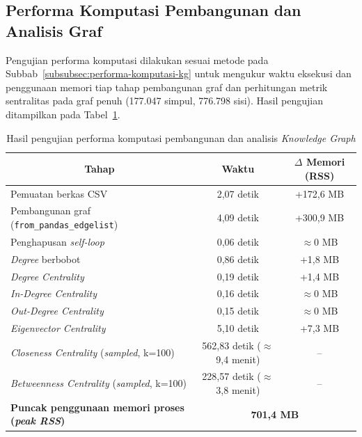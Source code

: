 \subsection{Performa Komputasi Pembangunan dan Analisis Graf}
Pengujian performa komputasi dilakukan sesuai metode pada Subbab~\ref{subsubsec:performa-komputasi-kg} untuk mengukur waktu eksekusi dan penggunaan memori tiap tahap pembangunan graf dan perhitungan metrik sentralitas pada graf penuh (177.047 simpul, 776.798 sisi). Hasil pengujian ditampilkan pada Tabel~\ref{tab:performa-komputasi-kg}.

\begin{table}[H]
\centering
\caption{Hasil pengujian performa komputasi pembangunan dan analisis \textit{Knowledge Graph}}
\label{tab:performa-komputasi-kg}
\renewcommand{\arraystretch}{1.3}
\begin{tabular}{|p{6.5cm}|c|c|}
\hline
\multicolumn{1}{|c|}{\textbf{Tahap}} & \multicolumn{1}{c|}{\textbf{Waktu}} & \multicolumn{1}{c|}{\textbf{$\Delta$ Memori (RSS)}} \\
\hline
Pemuatan berkas CSV & 2,07 detik & +172,6 MB \\
\hline
Pembangunan graf (\texttt{from\_pandas\_}\allowbreak\texttt{edgelist}) & 4,09 detik & +300,9 MB \\
\hline
Penghapusan \textit{self-loop} & 0,06 detik & $\approx$0 MB \\
\hline
\textit{Degree} berbobot & 0,86 detik & +1,8 MB \\
\hline
\textit{Degree Centrality} & 0,19 detik & +1,4 MB \\
\hline
\textit{In-Degree Centrality} & 0,16 detik & $\approx$0 MB \\
\hline
\textit{Out-Degree Centrality} & 0,15 detik & $\approx$0 MB \\
\hline
\textit{Eigenvector Centrality} & 5,10 detik & +7,3 MB \\
\hline
\textit{Closeness Centrality} (\textit{sampled}, k=100) & 562,83 detik ($\approx$9,4 menit) & -- \\
\hline
\textit{Betweenness Centrality} (\textit{sampled}, k=100) & 228,57 detik ($\approx$3,8 menit) & -- \\
\hline
\textbf{Puncak penggunaan memori proses (\textit{peak RSS})} & \multicolumn{2}{c|}{\textbf{701,4 MB}} \\
\hline
\end{tabular}
\end{table}

